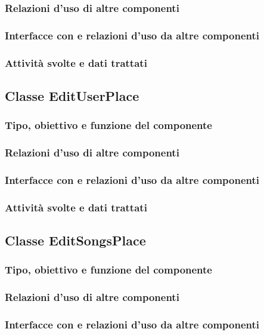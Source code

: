 \subsubsection*{Relazioni d'uso di altre componenti}
\subsubsection*{Interfacce con e relazioni d'uso da altre componenti}
\subsubsection*{Attivit\`a svolte e dati trattati}

\subsection{Classe EditUserPlace}
\subsubsection*{Tipo, obiettivo e funzione del componente}
\subsubsection*{Relazioni d'uso di altre componenti}
\subsubsection*{Interfacce con e relazioni d'uso da altre componenti}
\subsubsection*{Attivit\`a svolte e dati trattati}

\subsection{Classe EditSongsPlace}
\subsubsection*{Tipo, obiettivo e funzione del componente}
\subsubsection*{Relazioni d'uso di altre componenti}
\subsubsection*{Interfacce con e relazioni d'uso da altre componenti}
